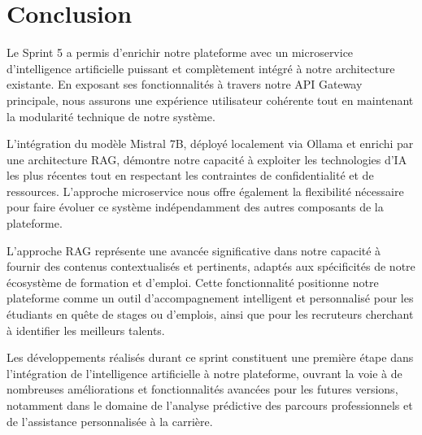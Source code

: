 \newpage
\section*{Conclusion}
Le Sprint 5 a permis d'enrichir notre plateforme avec un microservice d'intelligence artificielle puissant et complètement intégré à notre architecture existante. En exposant ses fonctionnalités à travers notre API Gateway principale, nous assurons une expérience utilisateur cohérente tout en maintenant la modularité technique de notre système.

L'intégration du modèle Mistral 7B, déployé localement via Ollama et enrichi par une architecture RAG, démontre notre capacité à exploiter les technologies d'IA les plus récentes tout en respectant les contraintes de confidentialité et de ressources. L'approche microservice nous offre également la flexibilité nécessaire pour faire évoluer ce système indépendamment des autres composants de la plateforme.

L'approche RAG représente une avancée significative dans notre capacité à fournir des contenus contextualisés et pertinents, adaptés aux spécificités de notre écosystème de formation et d'emploi. Cette fonctionnalité positionne notre plateforme comme un outil d'accompagnement intelligent et personnalisé pour les étudiants en quête de stages ou d'emplois, ainsi que pour les recruteurs cherchant à identifier les meilleurs talents.

Les développements réalisés durant ce sprint constituent une première étape dans l'intégration de l'intelligence artificielle à notre plateforme, ouvrant la voie à de nombreuses améliorations et fonctionnalités avancées pour les futures versions, notamment dans le domaine de l'analyse prédictive des parcours professionnels et de l'assistance personnalisée à la carrière. 